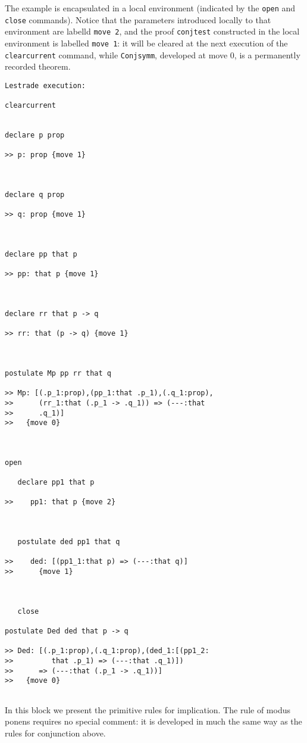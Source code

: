 \documentclass[12pt]{article}
\begin{document}
The example is encapsulated in a local environment (indicated by the {\tt open} and {\tt close} commands).  Notice that the parameters introduced locally to that environment
are labelld {\tt move 2}, and the proof {\tt conjtest} constructed in the local environment is labelled {\tt move 1}:  it will be cleared at the next execution of the {\tt clearcurrent}
command, while {\tt Conjsymm}, developed at move 0, is a permanently recorded theorem.

\begin{verbatim}Lestrade execution:

clearcurrent


declare p prop

>> p: prop {move 1}



declare q prop

>> q: prop {move 1}



declare pp that p

>> pp: that p {move 1}



declare rr that p -> q

>> rr: that (p -> q) {move 1}



postulate Mp pp rr that q

>> Mp: [(.p_1:prop),(pp_1:that .p_1),(.q_1:prop),
>>      (rr_1:that (.p_1 -> .q_1)) => (---:that
>>      .q_1)]
>>   {move 0}



open

   declare pp1 that p

>>    pp1: that p {move 2}



   postulate ded pp1 that q

>>    ded: [(pp1_1:that p) => (---:that q)]
>>      {move 1}



   close

postulate Ded ded that p -> q

>> Ded: [(.p_1:prop),(.q_1:prop),(ded_1:[(pp1_2:
>>         that .p_1) => (---:that .q_1)])
>>      => (---:that (.p_1 -> .q_1))]
>>   {move 0}


\end{verbatim}

In this block we present the primitive rules for implication.  The rule of modus ponens requires no special comment:  it is developed in much the same way as
the rules for conjunction above.
\end{document}

